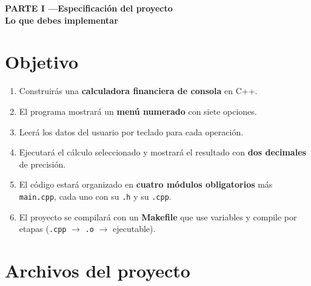 \documentclass[12pt, oneside]{article}
\begin{document}

\tableofcontents
\newpage

\begin{center}
  \Large\bfseries\color{dummies@black}
  PARTE I \enspace—\enspace Especificación del proyecto
  \vspace{4pt}\\
  \normalsize\mdseries\color{dummies@gray}
  Lo que debes implementar
\end{center}
\vspace{1em}

\section{Objetivo}

\begin{enumerate}
  \item Construirás una \textbf{calculadora financiera de consola} en C++.
  \item El programa mostrará un \textbf{menú numerado} con siete opciones.
  \item Leerá los datos del usuario por teclado para cada operación.
  \item Ejecutará el cálculo seleccionado y mostrará el resultado
        con \textbf{dos decimales} de precisión.
  \item El código estará organizado en \textbf{cuatro módulos obligatorios}
        más \texttt{main.cpp}, cada uno con su \texttt{.h} y su
        \texttt{.cpp}.
  \item El proyecto se compilará con un \textbf{Makefile} que use variables
        y compile por etapas
        (\texttt{.cpp} $\to$ \texttt{.o} $\to$ ejecutable).
\end{enumerate}

\section{Archivos del proyecto}
\end{document}
